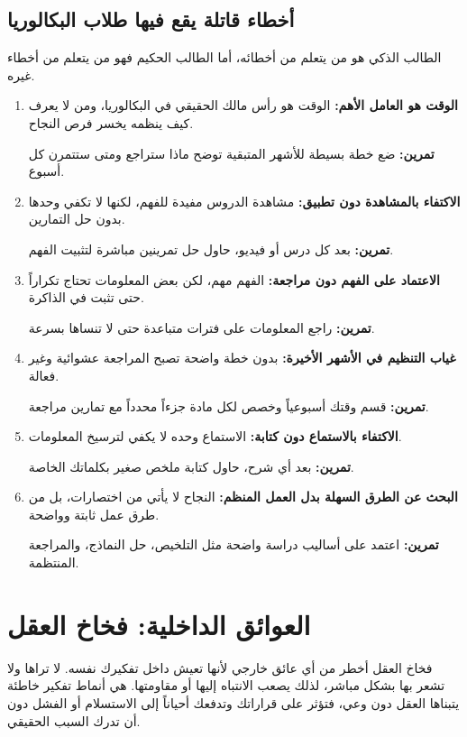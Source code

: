 \documentclass[12pt,a4paper]{book}
\newcommand{\exerciseAr}[1]{%
	\begin{exercise}
		\textbf{تمرين:} #1
	\end{exercise}
}
\begin{document}
\section{أخطاء قاتلة يقع فيها طلاب البكالوريا}
\label{sec:owner-experiences4}

الطالب الذكي هو من يتعلم من أخطائه، أما الطالب الحكيم فهو من يتعلم من أخطاء غيره. 

\begin{enumerate}
	\item \textbf{الوقت هو العامل الأهم:} الوقت هو رأس مالك الحقيقي في البكالوريا، ومن لا يعرف كيف ينظمه يخسر فرص النجاح. \\
	\exerciseAr{ضع خطة بسيطة للأشهر المتبقية توضح ماذا ستراجع ومتى ستتمرن كل أسبوع.}
	
	\item \textbf{الاكتفاء بالمشاهدة دون تطبيق:} مشاهدة الدروس مفيدة للفهم، لكنها لا تكفي وحدها بدون حل التمارين. \\
	\exerciseAr{بعد كل درس أو فيديو، حاول حل تمرينين مباشرة لتثبيت الفهم.}
	
	\item \textbf{الاعتماد على الفهم دون مراجعة:} الفهم مهم، لكن بعض المعلومات تحتاج تكراراً حتى تثبت في الذاكرة. \\
	\exerciseAr{راجع المعلومات على فترات متباعدة حتى لا تنساها بسرعة.}
	
	\item \textbf{غياب التنظيم في الأشهر الأخيرة:} بدون خطة واضحة تصبح المراجعة عشوائية وغير فعالة. \\
	\exerciseAr{قسم وقتك أسبوعياً وخصص لكل مادة جزءاً محدداً مع تمارين مراجعة.}
	
	\item \textbf{الاكتفاء بالاستماع دون كتابة:} الاستماع وحده لا يكفي لترسيخ المعلومات. \\
	\exerciseAr{بعد أي شرح، حاول كتابة ملخص صغير بكلماتك الخاصة.}
	
	\item \textbf{البحث عن الطرق السهلة بدل العمل المنظم:} النجاح لا يأتي من اختصارات، بل من طرق عمل ثابتة وواضحة. \\
	\exerciseAr{اعتمد على أساليب دراسة واضحة مثل التلخيص، حل النماذج، والمراجعة المنتظمة.}
\end{enumerate}
	
	\chapter{العوائق الداخلية: فخاخ العقل}
	\label{chap:internal-enemies}
فخاخ العقل أخطر من أي عائق خارجي لأنها تعيش داخل تفكيرك نفسه. لا تراها ولا تشعر بها بشكل مباشر، لذلك يصعب الانتباه إليها أو مقاومتها. هي أنماط تفكير خاطئة يتبناها العقل دون وعي، فتؤثر على قراراتك وتدفعك أحياناً إلى الاستسلام أو الفشل دون أن تدرك السبب الحقيقي.
	
\end{document}
